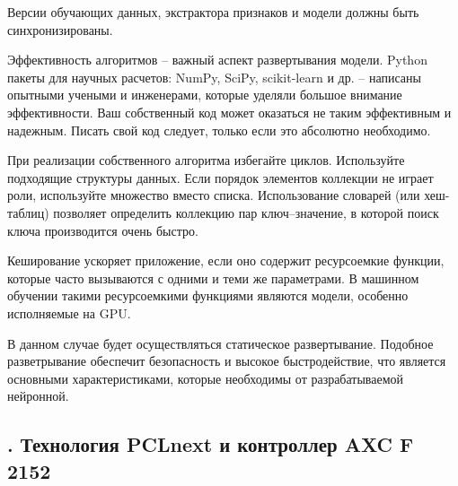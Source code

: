 {	\par \redline Версии обучающих данных, экстрактора признаков и модели должны быть синхронизированы.

	\par \redline Эффективность алгоритмов {--} важный аспект развертывания модели.	Python пакеты для научных расчетов: NumPy, SciPy, scikit-learn и др. {--} написаны опытными учеными и инженерами, которые уделяли большое внимание эффективности. Ваш собственный код может оказаться не таким эффективным и надежным. Писать свой код следует, только если это абсолютно необходимо.

	\par \redline При реализации собственного алгоритма избегайте циклов. Используйте подходящие структуры данных. Если порядок элементов коллекции не играет роли, используйте множество вместо списка. Использование словарей (или хеш-таблиц) позволяет определить коллекцию пар ключ–значение, в которой поиск ключа производится очень быстро.

	\par \redline Кеширование ускоряет приложение, если оно содержит ресурсоемкие функции, которые часто вызываются с одними и теми же параметрами. В машинном обучении такими ресурсоемкими функциями являются модели, особенно исполняемые на GPU.

	\par \redline В данном случае будет осуществляться статическое развертывание. Подобное разветрывание обеспечит безопасность и высокое быстродействие, что является основными характеристиками, которые необходимы от разрабатываемой нейронной.

	\par
}

\subtitlespace

\subsection*{
	\gostTitleFont
	\redline
	\thechaptercntr .\thesubchaptercntr \spc
	Технология PCLnext и контроллер AXC F 2152
} \addtocounter{subchaptercntr}{1}

\subtitlespace

